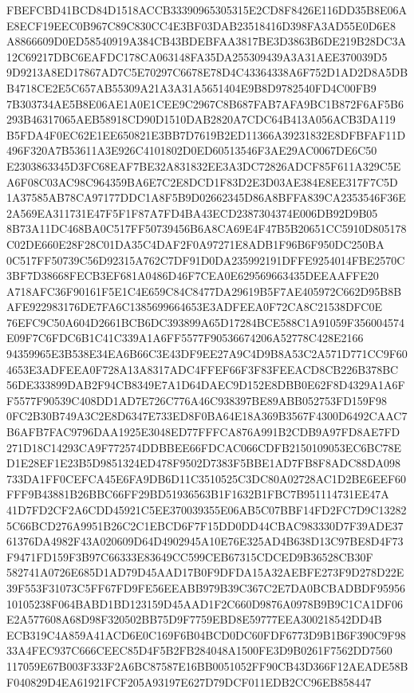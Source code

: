 \documentclass[UTF8,fontset=fandol,zihao=-4,a4paper]{ctexart}
\begin{document}
{{FBEFCBD41BCD84D1518ACCB33390965305315E2CD8F8426E116DD35B8E06AE8ECF19EEC0B967C89C830CC4E3BF03DAB23518416D398FA3AD55E0D6E8
A8866609D0ED58540919A384CB43BDEBFAA3817BE3D3863B6DE219B28DC3A12C69217DBC6EAFDC178CA063148FA35DA255309439A3A31AEE370039D5
9D9213A8ED17867AD7C5E70297C6678E78D4C43364338A6F752D1AD2D8A5DBB4718CE2E5C657AB55309A21A3A31A5651404E9B8D9782540FD4C00FB9
7B303734AE5B8E06AE1A0E1CEE9C2967C8B687FAB7AFA9BC1B872F6AF5B6293B46317065AEB58918CD90D1510DAB2820A7CDC64B413A056ACB3DA119
B5FDA4F0EC62E1EE650821E3BB7D7619B2ED11366A39231832E8DFBFAF11D496F320A7B53611A3E926C4101802D0ED60513546F3AE29AC0067DE6C50
E2303863345D3FC68EAF7BE32A831832EE3A3DC72826ADCF85F611A329C5EA6F08C03AC98C964359BA6E7C2E8DCD1F83D2E3D03AE384E8EE317F7C5D
1A37585AB78CA97177DDC1A8F5B9D02662345D86A8BFFA839CA2353546F36E2A569EA311731E47F5F1F87A7FD4BA43ECD2387304374E006DB92D9B05
8B73A11DC468BA0C517FF50739456B6A8CA69E4F47B5B20651CC5910D805178C02DE660E28F28C01DA35C4DAF2F0A97271E8ADB1F96B6F950DC250BA
0C517FF50739C56D92315A762C7DF91D0DA235992191DFFE9254014FBE2570C3BF7D38668FECB3EF681A0486D46F7CEA0E629569663435DEEAAFFE20
A718AFC36F90161F5E1C4E659C84C8477DA29619B5F7AE405972C662D95B8BAFE922983176DE7FA6C1385699664653E3ADFEEA0F72CA8C21538DFC0E
76EFC9C50A604D2661BCB6DC393899A65D17284BCE588C1A91059F356004574E09F7C6FDC6B1C41C339A1A6FF5577F90536674206A52778C428E2166
94359965E3B538E34EA6B66C3E43DF9EE27A9C4D9B8A53C2A571D771CC9F604653E3ADFEEA0F728A13A8317ADC4FFEF66F3F83FEEACD8CB226B378BC
56DE333899DAB2F94CB8349E7A1D64DAEC9D152E8DBB0E62F8D4329A1A6FF5577F90539C408DD1AD7E726C776A46C938397BE89ABB052753FD159F98
0FC2B30B749A3C2E8D6347E733ED8F0BA64E18A369B3567F4300D6492CAAC7B6AFB7FAC9796DAA1925E3048ED77FFFCA876A991B2CDB9A97FD8AE7FD
271D18C14293CA9F772574DDBBEE66FDCAC066CDFB2150109053EC6BC78ED1E28EF1E23B5D9851324ED478F9502D7383F5BBE1AD7FB8F8ADC88DA098
733DA1FF0CEFCA45E6FA9DB6D11C3510525C3DC80A02728AC1D2BE6EEF60FFF9B43881B26BBC66FF29BD51936563B1F1632B1FBC7B951114731EE47A
41D7FD2CF2A6CDD45921C5EE370039355E06AB5C07BBF14FD2FC7D9C132825C66BCD276A9951B26C2C1EBCD6F7F15DD0DD44CBAC983330D7F39ADE37
61376DA4982F43A020609D64D4902945A10E76E325AD4B638D13C97BE8D4F73F9471FD159F3B97C66333E83649CC599CEB67315CDCED9B36528CB30F
582741A0726E685D1AD79D45AAD17B0F9DFDA15A32AEBFE273F9D278D22E39F553F31073C5FF67FD9FE56EEABB979B39C367C2E7DA0BCBADBDF95956
10105238F064BABD1BD123159D45AAD1F2C660D9876A0978B9B9C1CA1DF06E2A577608A68D98F320502BB75D9F7759EBD8E59777EEA300218542DD4B
ECB319C4A859A41ACD6E0C169F6B04BCD0DC60FDF6773D9B1B6F390C9F9833A4FEC937C666CEEC85D4F5B2FB284048A1500FE3D9B0261F7562DD7560
117059E67B003F333F2A6BC87587E16BB0051052FF90CB43D366F12AEADE58BF040829D4EA61921FCF205A93197E627D79DCF011EDB2CC96EB858447
}}
\end{document}
